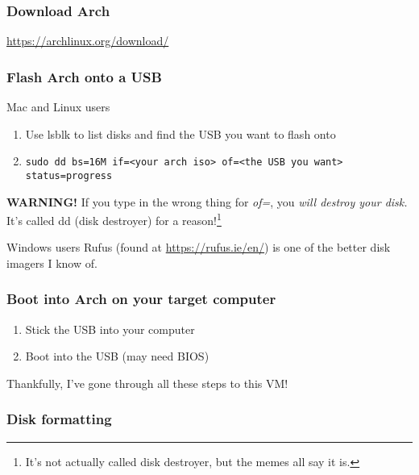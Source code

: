 \documentclass{beamer}
\begin{document}
\begin{frame}
    \frametitle{Download Arch}

    \large

    \url{https://archlinux.org/download/}
\end{frame}

\begin{frame}
    \frametitle{Flash Arch onto a USB}

    \begin{block}{Mac and Linux users}
        \begin{enumerate}
            \item Use lsblk to list disks and find the USB you want to flash onto
            \item \texttt{sudo dd bs=16M if=<your arch iso> of=<the USB you want> status=progress}
        \end{enumerate}

        \textbf{WARNING!} If you type in the wrong thing for \textit{of=}, you \textit{will destroy your disk.} It's called dd (disk destroyer) for a reason!\footnote{It's not actually called disk destroyer, but the memes all say it is.}
    \end{block}

    \begin{block}{Windows users}
        Rufus (found at \url{https://rufus.ie/en/}) is one of the better disk imagers I know of.
\end{block}
\end{frame}

\begin{frame}
    \frametitle{Boot into Arch on your target computer}

    \begin{enumerate}
        \item Stick the USB into your computer
        \item Boot into the USB (may need BIOS)
    \end{enumerate}
\end{frame}

\begin{frame}
    \Huge
    \centering

    Thankfully, I've gone through all these steps to this VM!
\end{frame}

\begin{frame}
    \frametitle{Disk formatting}
\end{frame}
\end{document}
